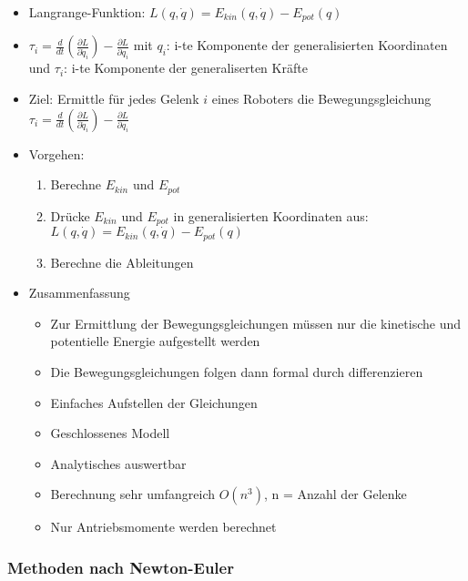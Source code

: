 \documentclass[paper=a4, fontsize=11pt]{scrartcl} %
\numberwithin{equation}{section} %
\numberwithin{figure}{section} %
\numberwithin{table}{section} %
\begin{document}
\begin{itemize}
\item Langrange-Funktion: $L(q, \dot q) = E_{kin}(q, \dot q) - E_{pot}(q)$
\item $\tau_i = \frac{d}{dt} (\frac{\partial L}{\partial \dot q_i}) - \frac{\partial L}{\partial q_i}$ mit $q_i$: i-te Komponente der generalisierten Koordinaten und $\tau_i$: i-te Komponente der generaliserten Kräfte
\item Ziel: Ermittle für jedes Gelenk $i$ eines Roboters die Bewegungsgleichung $\tau_i = \frac{d}{dt} (\frac{\partial L}{\partial \dot q_i}) - \frac{\partial L}{\partial q_i}$
\item Vorgehen:
\begin{enumerate}
\item Berechne $E_{kin}$ und $E_{pot}$
\item Drücke $E_{kin}$ und $E_{pot}$ in generalisierten Koordinaten aus: $L(q, \dot q) = E_{kin}(q, \dot q) - E_{pot}(q)$
\item Berechne die Ableitungen
\end{enumerate}
\item Zusammenfassung
\begin{itemize}
\item Zur Ermittlung der Bewegungsgleichungen müssen nur die kinetische und potentielle Energie aufgestellt werden
\item Die Bewegungsgleichungen folgen dann formal durch differenzieren
\item Einfaches Aufstellen der Gleichungen
\item Geschlossenes Modell
\item Analytisches auswertbar
\item Berechnung sehr umfangreich $O(n^3)$, n = Anzahl der Gelenke
\item Nur Antriebsmomente werden berechnet
\end{itemize}
\end{itemize}

\subsubsection{Methoden nach Newton-Euler}
\end{document}
